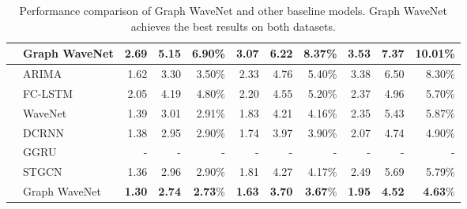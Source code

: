 \begin{table}[tb]
\begin{tabular}{l l  r r r | r r r |r r r}
		    &Graph WaveNet & \textbf{2.69}& \textbf{5.15} & \textbf{6.90}\% & \textbf{3.07} & \textbf{6.22} & \textbf{8.37}\% & \textbf{3.53} & \textbf{7.37} & \textbf{10.01}\%\\
			\midrule
			\multirow{6}{*}{\rotatebox[origin=c]{90}{PEMS-BAY}}
			&ARIMA \cite{li2018diffusion} & 1.62 & 3.30 & 3.50\% & 2.33 & 4.76 & 5.40\%& 3.38 & 6.50 & 8.30\% \\
			&FC-LSTM \cite{li2018diffusion} & 2.05 & 4.19 & 4.80\% & 2.20 & 4.55 & 5.20\%& 2.37 & 4.96 & 5.70\% \\
			&WaveNet \cite{oord2016wavenet} & 1.39 & 3.01 & 2.91\% & 1.83 & 4.21 & 4.16\% & 2.35 & 5.43 & 5.87\% \\ 
			&DCRNN \cite{li2018diffusion} & 1.38 & 2.95 & 2.90\% & 1.74 & 3.97 & 3.90\% & 2.07 & 4.74 & 4.90\% \\ 
			&GGRU \cite{zhang2018gaan}      & - & - & - & - & - & - & - & - & - \\
			&STGCN \cite{yu2018spatio} & 1.36 & 2.96 & 2.90\% & 1.81 & 4.27 & 4.17\% & 2.49 & 5.69 & 5.79\%\\

		    &Graph WaveNet &\textbf{1.30}&\textbf{2.74}&\textbf{2.73}\%&\textbf{1.63}&\textbf{3.70}&\textbf{3.67}\% & \textbf{1.95} & \textbf{4.52} & \textbf{4.63}\%\\
			\bottomrule
		\end{tabular}
		\caption{Performance comparison of Graph WaveNet and other baseline models. Graph WaveNet achieves the best results on both datasets.} 
		\label{table:result_traffic_speed}
	\end{table}
	
	
	




